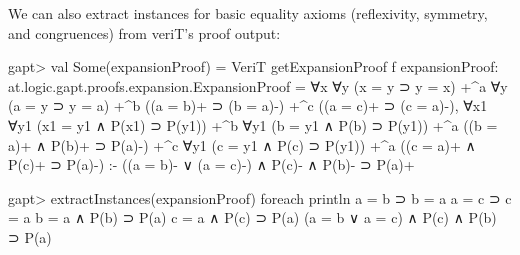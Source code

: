 \documentclass[a4paper,11pt]{book}
\begin{document}
We can also extract instances for basic equality axioms (reflexivity, symmetry,
and congruences) from veriT's proof output:
\begin{clilisting}
gapt> val Some(expansionProof) = VeriT getExpansionProof f
expansionProof: at.logic.gapt.proofs.expansion.ExpansionProof =
∀x ∀y (x = y ⊃ y = x)
  +^{a}
    ∀y (a = y ⊃ y = a)
    +^{b} ((a = b)+ ⊃ (b = a)-)
    +^{c} ((a = c)+ ⊃ (c = a)-),
∀x1 ∀y1 (x1 = y1 ∧ P(x1) ⊃ P(y1))
  +^{b} ∀y1 (b = y1 ∧ P(b) ⊃ P(y1)) +^{a} ((b = a)+ ∧ P(b)+ ⊃ P(a)-)
  +^{c} ∀y1 (c = y1 ∧ P(c) ⊃ P(y1)) +^{a} ((c = a)+ ∧ P(c)+ ⊃ P(a)-)
:-
((a = b)- ∨ (a = c)-) ∧ P(c)- ∧ P(b)- ⊃ P(a)+

gapt> extractInstances(expansionProof) foreach println
a = b ⊃ b = a
a = c ⊃ c = a
b = a ∧ P(b) ⊃ P(a)
c = a ∧ P(c) ⊃ P(a)
(a = b ∨ a = c) ∧ P(c) ∧ P(b) ⊃ P(a)

\end{clilisting}
\end{document}
